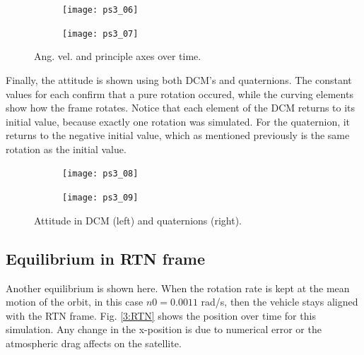 \documentclass[12pt, letterpaper]{article}
\begin{document}
\begin{figure}[H]
	\centering
	\begin{subfigure}[b]{0.49\textwidth}
		\texttt{[image: ps3\_06]}
	\end{subfigure}
	\begin{subfigure}[b]{0.49\textwidth}
		\texttt{[image: ps3\_07]}
	\end{subfigure}
	\caption{Ang. vel. and principle axes over time.}
	\label{3:5a}
\end{figure}

Finally, the attitude is shown using both DCM's and quaternions. The constant values for each confirm that a pure rotation occured, while the curving elements show how the frame rotates. Notice that each element of the DCM returns to its initial value, because exactly one rotation was simulated. For the quaternion, it returns to the negative initial value, which as mentioned previously is the same rotation as the initial value.

\begin{figure}[H]
	\centering
	\begin{subfigure}[b]{0.49\textwidth}
		\texttt{[image: ps3\_08]}
	\end{subfigure}
	\begin{subfigure}[b]{0.49\textwidth}
		\texttt{[image: ps3\_09]}
	\end{subfigure}
	\caption{Attitude in DCM (left) and quaternions (right).}
	\label{3:attitude}
\end{figure}


\subsection{Equilibrium in RTN frame}
Another equilibrium is shown here. When the rotation rate is kept at the mean motion of the orbit, in this case $n0=0.0011$ rad/s, then the vehicle stays aligned with the RTN frame. Fig. \ref{3:RTN} shows the position over time for this simulation. Any change in the x-position is due to numerical error or the atmospheric drag affects on the satellite.
\end{document}

